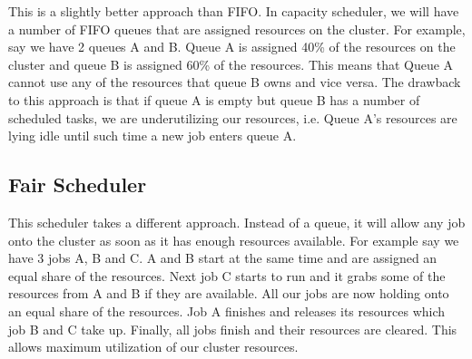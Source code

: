 This is a slightly better approach than FIFO. In capacity scheduler, we will have a number of FIFO queues that are assigned resources on the cluster. For example, say we have 2 queues A and B. Queue A is assigned 40\% of the resources on the cluster and queue B is assigned 60\% of the resources. This means that Queue A cannot use any of the resources that queue B owns and vice versa. 
The drawback to this approach is that if queue A is empty but queue B has a number of scheduled tasks, we are underutilizing our resources, i.e. Queue A's resources are lying idle until such time a new job enters queue A.

\subsection{Fair Scheduler}

This scheduler takes a different approach. Instead of a queue, it will allow any job onto the cluster as soon as it has enough resources available. For example say we have 3 jobs A, B and C. A and B start at the same time and are assigned an equal share of the resources. Next job C starts to run and it grabs some of the resources from A and B if they are available. All our jobs are now holding onto an equal share of the resources. Job A finishes and releases its resources which job B and C take up. Finally, all jobs finish and their resources are cleared. This allows maximum utilization of our cluster resources.
